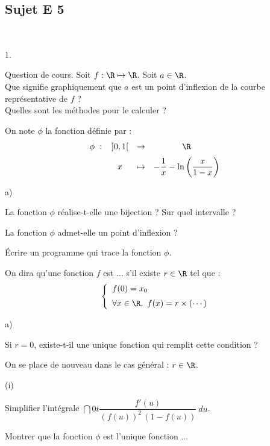 \documentclass[11pt]{article}%
\begin{document}
\newpage


\subsection*{Sujet E 5}

\begin{exerciceAP}~
 \begin{noliste}{1.}
  \item Question de cours. Soit $f: \R \mapsto \R$. Soit $a \in \R$.\\
  Que signifie graphiquement que $a$ est un point d'inflexion de la 
  courbe représentative de $f$ ?\\
  Quelles sont les méthodes pour le calculer ?
  
  \item On note $\phi$ la fonction définie par :
  \[
   \phi \ : \ 
   \begin{array}[t]{ccc}
    ]0,1[ & \to & \R
    \\[.2cm]
    x & \mapsto & - \dfrac{1}{x} - \ln
    \left(\dfrac{x}{1-x}\right)
   \end{array}
  \]
  \begin{noliste}{a)}
    \item La fonction $\phi$ réalise-t-elle une bijection ? Sur quel 
    intervalle ?
    
    \item La fonction $\phi$ admet-elle un point d'inflexion ?
    
    \item Écrire un programme \Scilab{} qui trace la fonction $\phi$.
  \end{noliste}
  
  \item On dira qu'une fonction $f$ est \og ... \fg{} s'il existe $r 
  \in \R$ tel que :
  \[
   \left\{
   \begin{array}{l}
    f(0) = x_0\\[.2cm]
    \forall x \in \R, \ f(x) = r \times 
    (\cdots)
   \end{array}
   \right.
  \]
  \begin{noliste}{a)}
    \item Si $r=0$, existe-t-il une unique fonction qui remplit cette 
    condition ?
    
    \item On se place de nouveau dans le cas général : $r\in \R$.
    \begin{nonoliste}{(i)}
     \item Simplifier l'intégrale $\dint{0}{t} \dfrac{f'(u)}{(f(u))^2 
     \, (1-f(u))} \ du$.
     
     \item Montrer que la fonction $\phi$ est l'unique fonction ...
    \end{nonoliste}
  \end{noliste}
 \end{noliste}
\end{exerciceAP}
\end{document}
